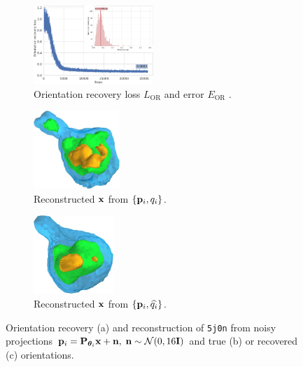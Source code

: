 \begin{figure}[t]
    \centering
    \begin{subfigure}[b]{0.42\textwidth}
        \centering
        \includegraphics[width=\linewidth,height=8em]{figures/5j0n_noise16_ar_aa}
        \caption{%
            Orientation recovery loss $L_\text{OR}$  and error $E_\text{OR}$ .
        }\label{fig:5j0n-noise16-orientation-recovery}
    \end{subfigure}
    \hfill
    \begin{subfigure}[b]{0.27\linewidth}
        \centering
        \includegraphics[height=8em]{figures/5j0n_reconstruction_GT_noise16}
        \caption{Reconstructed $\mathbf{x}$ from $\{ \mathbf{p}_i, q_i \}$.}
    \end{subfigure}
    \hfill
    \begin{subfigure}[b]{0.27\linewidth}
        \centering
        \includegraphics[height=8em]{figures/5j0n_reconstruction_noise16}
        \caption{Reconstructed $\mathbf{x}$ from $\{ \mathbf{p}_i, \widehat{q_i} \}$.}
    \end{subfigure}
    \caption{%
        Orientation recovery (a) and reconstruction of \texttt{5j0n} from noisy projections $\mathbf{p}_i = \mathbf{P}_{{\boldsymbol{\theta}}_i} \mathbf{x} + \mathbf{n}, \; \mathbf{n} \sim \mathcal{N}(0, 16\mathbf{I})$ and true (b) or recovered (c) orientations.
    }\label{fig:5j0n-noise16-reconstruction}
\end{figure}

